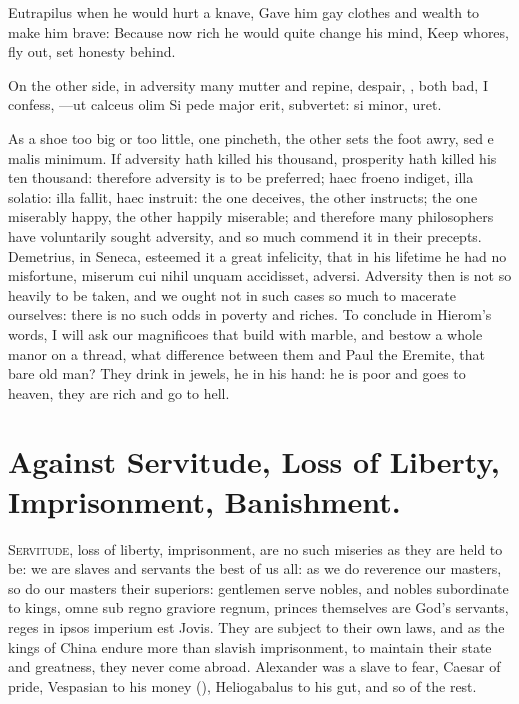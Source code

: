 {Eutrapilus when he would hurt a knave,
Gave him gay clothes and wealth to make him brave:
Because now rich he would quite change his mind,
Keep whores, fly out, set honesty behind.

On the other side, in adversity many mutter and repine, despair, \etc{},
both bad, I confess,
---ut calceus olim
Si pede major erit, subvertet: si minor, uret.

As a shoe too big or too little, one pincheth, the other sets the foot
awry, sed e malis minimum. If adversity hath killed his thousand,
prosperity hath killed his ten thousand: therefore adversity is to be
preferred; haec froeno indiget, illa solatio: illa fallit, haec
instruit: the one deceives, the other instructs; the one miserably
happy, the other happily miserable; and therefore many philosophers
have voluntarily sought adversity, and so much commend it in their
precepts. Demetrius, in Seneca, esteemed it a great infelicity, that in
his lifetime he had no misfortune, miserum cui nihil unquam accidisset,
adversi. Adversity then is not so heavily to be taken, and we ought not
in such cases so much to macerate ourselves: there is no such odds in
poverty and riches. To conclude in Hierom's words, I will ask our
magnificoes that build with marble, and bestow a whole manor on a
thread, what difference between them and Paul the Eremite, that bare
old man? They drink in jewels, he in his hand: he is poor and goes to
heaven, they are rich and go to hell.


\section{Against Servitude, Loss of Liberty, Imprisonment, Banishment.}

\lettrine{S}{ervitude}, loss of liberty, imprisonment, are no such miseries as they
are held to be: we are slaves and servants the best of us all: as we do
reverence our masters, so do our masters their superiors: gentlemen
serve nobles, and nobles subordinate to kings, omne sub regno graviore
regnum, princes themselves are God's servants, reges in ipsos imperium
est Jovis. They are subject to their own laws, and as the kings of
China endure more than slavish imprisonment, to maintain their state
and greatness, they never come abroad. Alexander was a slave to fear,
Caesar of pride, Vespasian to his money (), Heliogabalus to his gut, and so of the rest.

}
